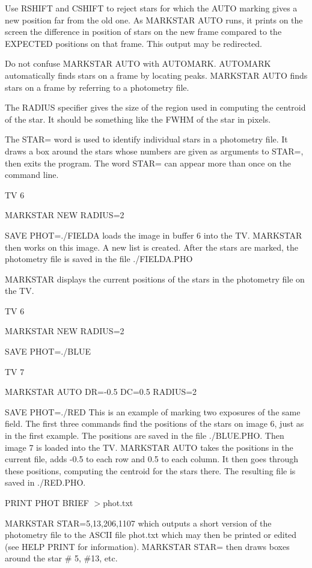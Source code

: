 Use RSHIFT and CSHIFT to reject stars for which the AUTO marking gives a
new position far from the old one.  As MARKSTAR AUTO runs, it prints on the
screen the difference in position of stars on the new frame compared to the
EXPECTED positions on that frame.  This output may be redirected.

Do not confuse MARKSTAR AUTO with AUTOMARK.  AUTOMARK automatically finds
stars on a frame by locating peaks.  MARKSTAR AUTO finds stars on a frame
by referring to a photometry file.

The RADIUS specifier gives the size of the region used in computing the
centroid of the star.  It should be something like the FWHM of the star in
pixels.

The STAR= word is used to identify individual stars in a photometry file.
It draws a box around the stars whose numbers are given as arguments to
STAR=, then exits the program.  The word STAR= can appear more than once on
the command line.

\begin{example}
  \item[TV 6\hfill]{}
  \item[MARKSTAR NEW RADIUS=2\hfill]{}
  \item[SAVE PHOT=./FIELDA\hfill]{
loads the image in buffer 6 into the TV.  MARKSTAR
then works on this image.  A new list is created.
After the stars are marked, the photometry file is
saved in the file ./FIELDA.PHO}
  \item[MARKSTAR\hfill]{
displays the current positions of the stars in the
photometry file on the TV.}
  \item[TV 6 \hfill]{}
  \item[MARKSTAR NEW RADIUS=2\hfill]{}
  \item[SAVE PHOT=./BLUE\hfill]{}
  \item[TV 7\hfill]{}
  \item[MARKSTAR AUTO DR=-0.5 DC=0.5 RADIUS=2\hfill]{}
  \item[SAVE PHOT=./RED\hfill]{ This is an example of marking two exposures
       of the same field.  The first three commands find the positions of
       the stars on image 6, just as in the first example.  The positions
       are saved in the file ./BLUE.PHO.  Then image 7 is loaded into the
       TV.  MARKSTAR AUTO takes the positions in the current file, adds
       -0.5 to each row and 0.5 to each column. It then goes through these
       positions, computing the centroid for the stars there.  The
       resulting file is saved in ./RED.PHO.}

  \item[PRINT PHOT BRIEF $>$phot.txt\hfill]{}

  \item[MARKSTAR STAR=5,13,206,1107\hfill]{ which outputs a short version
       of the photometry file to the ASCII file phot.txt which may then be
       printed or edited (see HELP PRINT for information).  MARKSTAR STAR=
       then draws boxes around the star \# 5, \#13, etc.}
\end{example}

